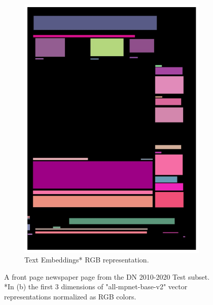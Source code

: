 \documentclass[oneside, english, bibtex]{kththesis}
\begin{document}
\begin{figure}[!htb]
\begin{adjustbox}{center,max size={\textwidth}{0.9\textheight}}
{\begin{subfigure}{0.75\textwidth}
  \includegraphics[width=\linewidth, clip=true, trim = 0mm 0mm 0mm 0mm]{figures/tf/JIefsDa.jpg}
  \caption{Text Embeddings* RGB representation.}
  \label{fig:JIefsDa_tf}
\end{subfigure}}
\end{adjustbox}
  \caption{A front page newspaper page from the DN 2010-2020 Test subset. *In (b) the first 3 dimensions of "all-mpnet-base-v2" vector representations normalized as RGB colors.}
\label{fig:JIefsDa_tf_comp}
\end{figure}

\clearpage 
\end{document}
